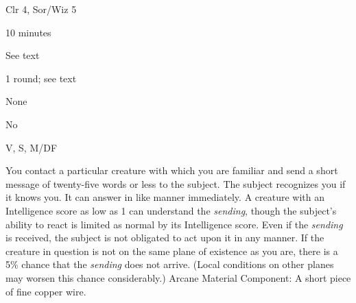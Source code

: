 
\begin{description*}
\item[Level:] Clr 4, Sor/Wiz 5
\item[Casting Time:] 10 minutes
\item[Range:] See text
\item[Duration:] 1 round; see text
\item[Saving Throw:] None
\item[Spell Resistance:] No
\item[Components:] V, S, M/DF
\end{description*}

You contact a particular creature with which you are familiar and send a short
message of twenty-five words or less to the subject. The subject recognizes you
if it knows you. It can answer in like manner immediately. A creature with an Intelligence
score as low as 1 can understand the \textit{sending}, though the subject's ability
to react is limited as normal by its Intelligence score. Even if the \textit{sending
}is received, the subject is not obligated to act upon it in any manner.
If the creature in question is not on the same plane of existence as you are, there
is a 5\% chance that the \textit{sending} does not arrive. (Local conditions on
other planes may worsen this chance considerably.)
Arcane Material Component: A short piece of fine copper wire.